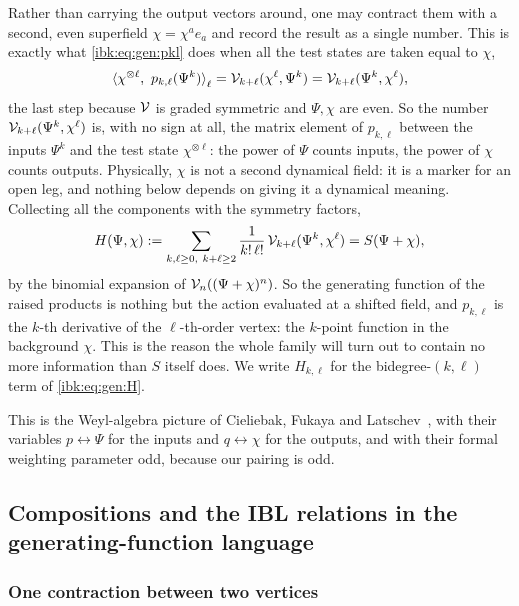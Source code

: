 Rather than carrying the output vectors around, one may contract them with a second, even superfield $\chi=\chi^ae_a$ and record the result as a single number. This is exactly what \eqref{ibk:eq:gen:pkl} does when all the test states are taken equal to $\chi$,
\begin{equation}
  \label{ibk:eq:gen:one-output}
  \braket{\chi^{\otimes\ell},\ p_{k,\ell}(\Psi^k)}_\ell
    = {\mathcal{V}}_{k+\ell}(\chi^\ell,\Psi^k)
    = {\mathcal{V}}_{k+\ell}(\Psi^k,\chi^\ell),
\end{equation}
the last step because ${\mathcal{V}}$ is graded symmetric and $\Psi,\chi$ are even. So the number ${\mathcal{V}}_{k+\ell}(\Psi^k,\chi^\ell)$ is, with no sign at all, the matrix element of $p_{k,\ell}$ between the inputs $\Psi^k$ and the test state $\chi^{\otimes\ell}$: the power of $\Psi$ counts inputs, the power of $\chi$ counts outputs. Physically, $\chi$ is not a second dynamical field: it is a marker for an open leg, and nothing below depends on giving it a dynamical meaning. Collecting all the components with the symmetry factors,
\begin{equation}
  \label{ibk:eq:gen:H}
  H(\Psi,\chi)
    := \sum_{k,\ell\ge0,\ k+\ell\ge2}\frac{1}{k!\,\ell!}\,{\mathcal{V}}_{k+\ell}(\Psi^k,\chi^\ell)
    = S(\Psi+\chi),
\end{equation}
by the binomial expansion of ${\mathcal{V}}_n((\Psi+\chi)^n)$. So the generating function of the raised products is nothing but the action evaluated at a shifted field, and $p_{k,\ell}$ is the $k$-th derivative of the $\ell$-th-order vertex: the $k$-point function in the background $\chi$. This is the reason the whole family will turn out to contain no more information than $S$ itself does. We write $H_{k,\ell}$ for the bidegree-$(k,\ell)$ term of \eqref{ibk:eq:gen:H}.

This is the Weyl-algebra picture of Cieliebak, Fukaya and Latschev~\cite[\S7]{Cieliebak:2015:HomologicalAlgebraRelated}, with their variables $p\leftrightarrow\Psi$ for the inputs and $q\leftrightarrow\chi$ for the outputs, and with their formal weighting parameter odd, because our pairing is odd.

\subsection{Compositions and the IBL relations in the generating-function language}
\label{ibk:sec:compositions}

\subsubsection{One contraction between two vertices}
\label{ibk:sec:comp:one}

